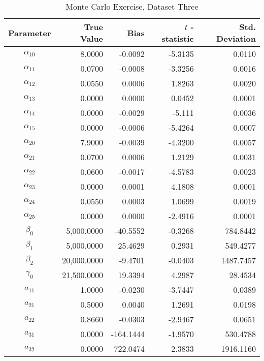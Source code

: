 \begin{table}\onehalfspacing
\begin{center}
\begin{threeparttable}
  \caption{Monte Carlo Exercise, Dataset Three}
  \label{Monte Carlo: Three}
  \begin{tabular}{crrrr}\toprule

  Parameter & True Value & Bias & $t$ - statistic & Std. Deviation \\
  \midrule
  $\alpha_{10}$ &    \phantom{20000}8.0000 &   -0.0092 &  -5.3135 &    0.0110 \\
  $\alpha_{11}$ &      0.0700 & -0.0008 & -3.3256 & 0.0016 \\
  $\alpha_{12}$ &      0.0550 & 0.0006 & 1.8263 & 0.0020\\
  $\alpha_{13}$ &      0.0000 &  0.0000 & 0.0452 & 0.0001\\
  $\alpha_{14}$ &      0.0000 & -0.0029 & -5.111  & 0.0036 \\
  $\alpha_{15}$ &      0.0000 & -0.0006 & -5.4264   & 0.0007 \\
  $\alpha_{20}$ &      7.9000 & -0.0039 & -4.3200  & 0.0057    \\
  $\alpha_{21}$ &      0.0700 &  0.0006 & 1.2129  & 0.0031    \\
  $\alpha_{22}$ &      0.0600 & -0.0017 & -4.5783    & 0.0023\\
  $\alpha_{23}$ &      0.0000 & 0.0001 & 4.1808  & 0.0001    \\
  $\alpha_{24}$ &      0.0550 & 0.0003 & 1.0699   & 0.0019  \\
  $\alpha_{25}$ &      0.0000 & 0.0000 & -2.4916    & 0.0001 \\
  $\beta_{0}$   &   5,000.0000 & -40.5552 & -0.3268  & 784.8442  \\
  $\beta_{1}$   &   5,000.0000 & 25.4629 & 0.2931  & 549.4277  \\
  $\beta_{2}$   &   20,000.0000 & -9.4701 & -0.0403 & 1487.7457  \\
  $\gamma_{0}$  &   21,500.0000 & 19.3394 & 4.2987 & 28.4534 \\
  $a_{11}$      &      1.0000 & -0.0230 & -3.7447 & 0.0389 \\
  $a_{21}$      &      0.5000 & 0.0040 & 1.2691 & 0.0198  \\
  $a_{22}$      &      0.8660 & -0.0303 & -2.9467  & 0.0651 \\
  $a_{31}$      &      0.0000 & -164.1444 & -1.9570  & 530.4788  \\
  $a_{32}$      &      0.0000 & 722.0474 & 2.3833  & 1916.1160  \\

\end{tabular}
\end{threeparttable}
\end{center}
\end{table}
